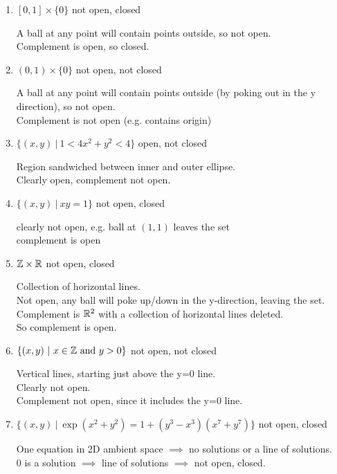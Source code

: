 \documentclass[12pt]{article}
\begin{document}
\begin{enumerate}
\item $[0, 1] \times \{0\}$ not open, closed\\
  \begin{tiny}
    A ball at any point will contain points outside, so not open.\\
    Complement is open, so closed.
    \par
  \end{tiny}
\item $(0, 1) \times \{0\}$ not open, not closed\\
  \begin{tiny}
    A ball at any point will contain points outside (by poking out in the y direction), so not open.\\
    Complement is not open (e.g. contains origin)
    \par
  \end{tiny}
\item $\{(x,y) ~|~ 1 < 4x^2 + y^2 < 4\}$ open, not closed\\
  {\tiny
    Region sandwiched between inner and outer ellipse.\\
    Clearly open, complement not open.
    \par}
\item $\{(x,y) ~|~ xy = 1\}$ not open, closed\\
  {\tiny
    clearly not open, e.g. ball at $(1,1)$ leaves the set\\
    complement is open
    \par}
\item $\mathbb{Z} \times \mathbb{R}$ not open, closed\\
  {\tiny
    Collection of horizontal lines.\\
    Not open, any ball will poke up/down in the y-direction, leaving the set.\\
    Complement is $\mathbb{R}^2$ with a collection of horizontal lines deleted.\\
    So complement is open.
    \par}
\item $\{(x,y) ~|~ x \in \mathbb{Z} \text{~and~} y > 0\}$ not open, not closed\\
  {\tiny
    Vertical lines, starting just above the y=0 line.\\
    Clearly not open.\\
    Complement not open, since it includes the y=0 line.
    \par}
\item $\{(x,y) ~|~ \exp(x^2 + y^2) = 1 + (y^3 - x^3)(x^7 + y^7)\}$ not open, closed\\
  \begin{tiny}
    One equation in 2D ambient space $\implies$ no solutions or a line of solutions.\\
    0 is a solution $\implies$ line of solutions $\implies$ not open, closed.\\
    \par
  \end{tiny}
\end{enumerate}
\end{document}
